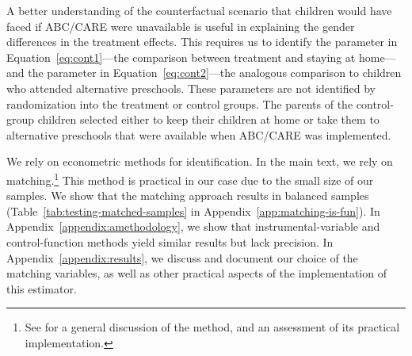 A better understanding of the counterfactual scenario that children would have faced if ABC/CARE were unavailable is useful in explaining the gender differences in the treatment effects. This requires us to identify the parameter in Equation~\eqref{eq:cont1}---the comparison between treatment and staying at home---and the parameter in Equation~\eqref{eq:cont2}---the analogous comparison to children who attended alternative preschools. These parameters are not identified by randomization into the treatment or control groups. The parents of the control-group children selected either to keep their children at home or take them to alternative preschools that were available when ABC/CARE was implemented. 

We rely on econometric methods for identification. In the main text, we rely on matching.\footnote{See \citet{Heckman_Ichimura_etal_1998_REStud} for a general discussion of the method, and an assessment of its practical implementation.} This method is practical in our case due to the small size of our samples. We show that the matching approach results in balanced samples (Table~\ref{tab:testing-matched-samples} in Appendix~\ref{app:matching-is-fun}). In Appendix~\ref{appendix:amethodology}, we show that instrumental-variable and control-function methods yield similar results but lack precision. In Appendix~\ref{appendix:results}, we discuss and document our choice of the matching variables, as well as other practical aspects of the implementation of this estimator.


